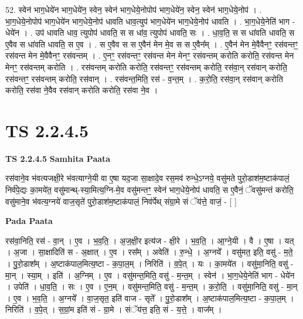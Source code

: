 \documentclass[17pt]{extarticle}
\begin{document}
52. स्वेन॑ भाग॒धेये॑न भाग॒धेये॑न॒ स्वेन॒ स्वेन॑ भाग॒धेये॒नोपोप॑ भाग॒धेये॑न॒ स्वेन॒ स्वेन॑ भाग॒धेये॒नोप॑ । . भा॒ग॒धेये॒नोपोप॑ भाग॒धेये॑न भाग॒धेये॒नोप॑ धावति धाव॒त्युप॑ भाग॒धेये॑न भाग॒धेये॒नोप॑ धावति । . भा॒ग॒धेये॒नेति॑ भाग - धेये॑न । . उप॑ धावति धाव॒ त्युपोप॑ धावति॒ स स धा॑व॒ त्युपोप॑ धावति॒ सः । . धा॒व॒ति॒ स स धा॑वति धावति॒ स ए॒वैव स धा॑वति धावति॒ स ए॒व । . स ए॒वैव स स ए॒वैन॑ मेन मे॒व स स ए॒वैन᳚म् । . ए॒वैन॑ मेन मे॒वैवैनꣳ॒॒ रस॑वन्तꣳ॒॒ रस॑वन्त मेन मे॒वैवैनꣳ॒॒ रस॑वन्तम् । . ए॒नꣳ॒॒ रस॑वन्तꣳ॒॒ रस॑वन्त मेन मेनꣳ॒॒ रस॑वन्तम् करोति करोति॒ रस॑वन्त मेन मेनꣳ॒॒ रस॑वन्तम् करोति । . रस॑वन्तम् करोति करोति॒ रस॑वन्तꣳ॒॒ रस॑वन्तम् करोति॒ रस॑वा॒न् रस॑वान् करोति॒ रस॑वन्तꣳ॒॒ रस॑वन्तम् करोति॒ रस॑वान् । . रस॑वन्त॒मिति॒ रस॑ - व॒न्त॒म् । . क॒रो॒ति॒ रस॑वा॒न् रस॑वान् करोति करोति॒ रस॑वा ने॒वैव रस॑वान् करोति करोति॒ रस॑वा ने॒व । \newline
\pagebreak
{}

\section{ TS 2.2.4.5 }

\textbf{TS 2.2.4.5 } \newline
\textbf{Samhita Paata} \newline

रस॑वाने॒व भ॑वत्यजक्षी॒रे भ॑वत्याग्ने॒यी वा ए॒षा यद॒जा सा॒क्षादे॒व रस॒मव॑ रुन्धे॒ऽग्नये॒ वसु॑मते पुरो॒डाश॑म॒ष्टाक॑पालं॒ निर्व॑पे॒द्यः का॒मये॑त॒ वसु॑मान्थ्-स्या॒मित्य॒ग्नि-मे॒व वसु॑मन्तꣳ॒॒ स्वेन॑ भाग॒धेये॒नोप॑ धावति॒ स ए॒वैनं॒ ॅवसु॑मन्तं करोति॒ वसु॑माने॒व भ॑वत्य॒ग्नये॑ वाज॒सृते॑ पुरो॒डाश॑म॒ष्टाक॑पालं॒ निव॑र्पेथ् संग्रा॒मे सं ॅय॑त्ते॒ वाजं॒ - [  ] \newline

\textbf{Pada Paata} \newline

रस॑वा॒निति॒ रस॑ - वा॒न् । ए॒व । भ॒व॒ति॒ । अ॒ज॒क्षी॒र इत्य॑ज - क्षी॒रे । भ॒व॒ति॒ । आ॒ग्ने॒यी । वै । ए॒षा । यत् । अ॒जा । सा॒क्षादिति॑ स - अ॒क्षात् । ए॒व । रस᳚म् । अवेति॑ । रु॒न्धे॒ । अ॒ग्नये᳚ । वसु॑मत॒ इति॒ वसु॑ - म॒ते॒ । पु॒रो॒डाश᳚म् । अ॒ष्टाक॑पाल॒मित्य॒ष्टा - क॒पा॒ल॒म् । निरिति॑ । व॒पे॒त् । यः । का॒मये॑त । वसु॑मा॒निति॒ वसु॑ - मा॒न् । स्या॒म् । इति॑ । अ॒ग्निम् । ए॒व । वसु॑मन्त॒मिति॒ वसु॑ - म॒न्त॒म् । स्वेन॑ । भा॒ग॒धेये॒नेति॑ भाग - धेये॑न । उपेति॑ । धा॒व॒ति॒ । सः । ए॒व । ए॒न॒म् । वसु॑मन्त॒मिति॒ वसु॑ - म॒न्त॒म् । क॒रो॒ति॒ । वसु॑मा॒निति॒॒ वसु॑ - मा॒न् । ए॒व । भ॒व॒ति॒ । अ॒ग्नये᳚ । वा॒ज॒सृत॒ इति॑ वाज - सृते᳚ । पु॒रो॒डाश᳚म् । अ॒ष्टाक॑पाल॒मित्य॒ष्टा - क॒पा॒ल॒म् । निरिति॑ । व॒पे॒त् । स॒ग्रां॒म इति॑ सं - ग्रा॒मे । संॅय॑त्त॒ इति॒ सं - य॒त्ते॒ । वाज᳚म् ।  \newline
\end{document}
